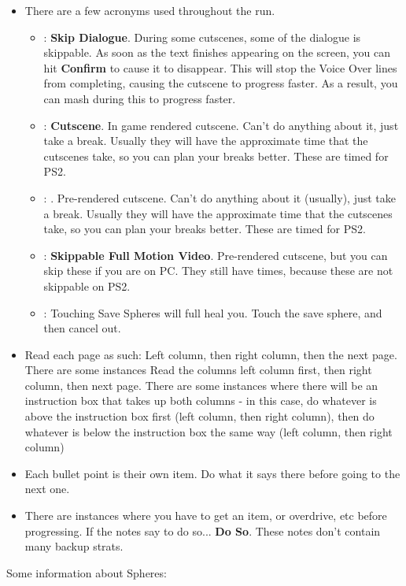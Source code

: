\begin{itemize}
	\item There are a few acronyms used throughout the run.
	      \begin{itemize}
		      \item \sd: \textbf{Skip Dialogue}. During some cutscenes, some of the dialogue is skippable. As soon as the text finishes appearing on the screen, you can hit \textbf{Confirm} to cause it to disappear. This will stop the Voice Over lines from completing, causing the cutscene to progress faster. As a result, you can mash during this to progress faster.
		      \item \cs: \textbf{Cutscene}. In game rendered cutscene. Can't do anything about it, just take a break. Usually they will have the approximate time that the cutscenes take, so you can plan your breaks better. These are timed for PS2.
		      \item \fmv: . Pre-rendered cutscene. Can't do anything about it (usually), just take a break. Usually they will have the approximate time that the cutscenes take, so you can plan your breaks better. These are timed for PS2.
		      \item \skippablefmv: \textbf{Skippable Full Motion Video}. Pre-rendered cutscene, but you can skip these if you are on PC. They still have times, because these are not skippable on PS2.
		      \item \save: Touching Save Spheres will full heal you. Touch the save sphere, and then cancel out.
	      \end{itemize}
	\item Read each page as such: Left column, then right column, then the next page. There are some instances Read the columns left column first, then right column, then next page. There are some instances where there will be an instruction box that takes up both columns - in this case, do whatever is above the instruction box first (left column, then right column), then do whatever is below the instruction box the same way (left column, then right column)
	\item Each bullet point is their own item. Do what it says there before going to the next one.
	\item There are instances where you have to get an item, or overdrive, etc before progressing. If the notes say to do so... \textbf{Do So}. These notes don't contain many backup strats.
\end{itemize}

Some information about Spheres:

